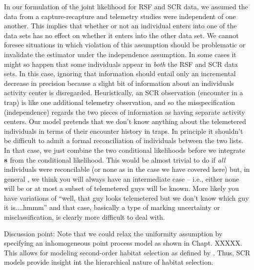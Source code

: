 In our formulation of the joint likelihood for RSF and SCR data, we
assumed the data from a capture-recapture and telemetry studies were
independent of one another. This implies that whether or not an
individual enters into one of the data sets has no effect on whether
it enters into the other data set. We cannot foresee situations in
which violation of this assumption should be problematic or invalidate
the estimator under the independence assumption.  In some cases it
might so happen that some individuals appear in {\it both} the RSF and
SCR data sets. In this case, ignoring that information should entail
only an incremental decrease in precision because a slight bit of
information about an individuals activity center is
disregarded. Heuristically, an SCR observation (encounter in a trap)
is like one additional telemetry observation, and so the
misspecification (independence)
regards the
two pieces of information as having separate activity centers.
 Our model pretends that we don't know anything
about the telemetered individuals in terms of their encounter history
in traps.  In principle it shouldn't be difficult to admit a formal
reconciliation of individuals between the two lists. In that case, we
just combine the two conditional likelihoods before we integrate ${\bf
  s}$ from the conditional likelihood. This would be almost trivial to
do if {\it all} individuals were reconcilable (or none as in the case
we have covered here) but, in general , we think you will always have
an intermediate case -- i.e., either none will be or at most a subset
of telemetered guys will be known. More likely you have variations of ``well, that
guy looks telemetered but we don't know which guy it is....hmmm'' and
that case, basically a type of marking uncertainty or
misclassification, is clearly more difficult to deal with.

Discussion point: Note that we could
relax the uniformity assumption by specifying an inhomogeneous point
process model \citep{borchers_efford:2008}
as shown in
Chapt. XXXXX.
This allows for modeling second-order habitat
selection as defined by \citet{johnson:1980}.
Thus, SCR models
provide insight int the hierarchical nature of habitat selection.







